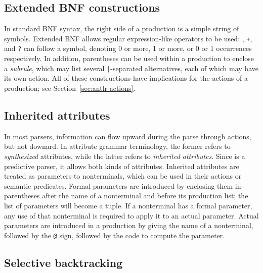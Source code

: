 \subsection{Extended BNF constructions}

In standard BNF syntax, the right side of a production is a simple string of symbols.  Extended BNF allows regular expression-like operators to be used: {\tt *}, {\tt +}, and {\tt ?} can follow a symbol, denoting 0 or more, 1 or more, or 0 or 1 occurrences respectively.  In addition, parentheses can be used within a production to enclose a \emph{subrule}, which may list several {\tt |}-separated alternatives, each of which may have its own action.  All of these constructions have implications for the actions of a production; see Section~\ref{sec:antlr-actions}.

\subsection{Inherited attributes}

In most parsers, information can flow upward during the parse through actions, but not downard.  In attribute grammar terminology, the former refers to \emph{synthesized} attributes, while the latter refers to \emph{inherited attributes}.  Since \antlr{} is a predictive parser, it allows both kinds of attributes.  Inherited attributes are treated as parameters to nonterminals, which can be used in their actions or semantic predicates.  Formal parameters are introduced by enclosing them in parentheses after the name of a nonterminal and before its production list; the list of parameters will become a tuple.  If a nonterminal has a formal parameter, any use of that nonterminal is required to apply it to an actual parameter.  Actual parameters are introduced in a production by giving the name of a nonterminal, followed by the {\tt @} sign, followed by the code to compute the parameter.

\subsection{Selective backtracking}

